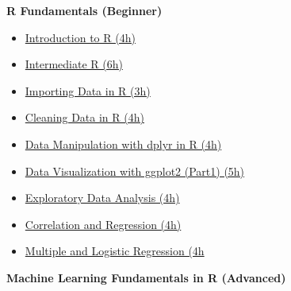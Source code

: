 \documentclass[
  11pt,
]{article}
\providecommand{\tightlist}{%
  \setlength{\itemsep}{0pt}\setlength{\parskip}{0pt}}
\newenvironment{tips}[1]
  {
  \begin{itemize}
  \footnotesize
  \renewcommand{\labelitemi}{
    \raisebox{-.7\height}[0pt][0pt]{
      {\setkeys{Gin}{width=3em,keepaspectratio}
        \texttt{[image: images/\#1.png]}}
    }
  }
  \setlength{\fboxsep}{1em}
  \begin{rbox}
  \item
  }
  {
  \end{rbox}
  \end{itemize}
  }
\begin{document}
\begin{tips}r

\textbf{R Fundamentals (Beginner)}

\begin{itemize}
\tightlist
\item
  \href{https://www.datacamp.com/courses/free-introduction-to-r}{Introduction to R (4h)}
\item
  \href{https://www.datacamp.com/courses/intermediate-r}{Intermediate R (6h)}
\item
  \href{https://www.datacamp.com/courses/importing-data-in-r-part-1}{Importing Data in R (3h)}
\item
  \href{https://www.datacamp.com/courses/cleaning-data-in-r}{Cleaning Data in R (4h)}
\item
  \href{https://www.datacamp.com/courses/data-manipulation-with-dplyr-in-r}{Data Manipulation with dplyr in R (4h)}
\item
  \href{https://www.datacamp.com/courses/data-visualization-with-ggplot2-1}{Data Visualization with ggplot2 (Part1) (5h)}
\item
  \href{https://www.datacamp.com/courses/exploratory-data-analysis}{Exploratory Data Analysis (4h)}
\item
  \href{https://www.datacamp.com/courses/correlation-and-regression}{Correlation and Regression (4h)}
\item
  \href{https://www.datacamp.com/courses/multiple-and-logistic-regression}{Multiple and Logistic Regression (4h}
\end{itemize}

\textbf{Machine Learning Fundamentals in R (Advanced)}


\end{tips}
\end{document}
